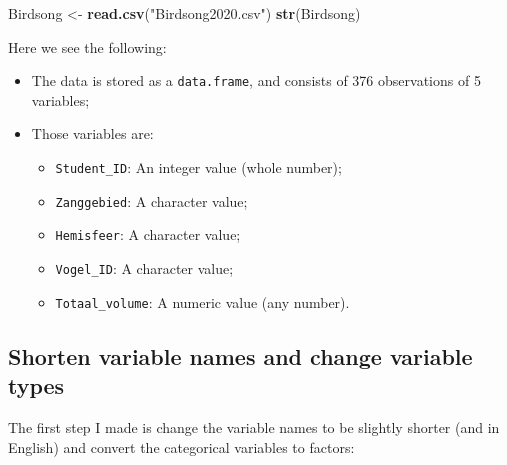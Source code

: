 \documentclass[
]{book}
\newenvironment{Shaded}{\begin{snugshade}}{\end{snugshade}}
\newcommand{\KeywordTok}[1]{\textcolor[rgb]{0.13,0.29,0.53}{\textbf{#1}}}
\newcommand{\NormalTok}[1]{#1}
\newcommand{\OperatorTok}[1]{\textcolor[rgb]{0.81,0.36,0.00}{\textbf{#1}}}
\newcommand{\StringTok}[1]{\textcolor[rgb]{0.31,0.60,0.02}{#1}}
\providecommand{\tightlist}{%
  \setlength{\itemsep}{0pt}\setlength{\parskip}{0pt}}
\begin{document}
\begin{Shaded}
\begin{Highlighting}[]
\NormalTok{Birdsong <-}\StringTok{ }\KeywordTok{read.csv}\NormalTok{(}\StringTok{"Birdsong2020.csv"}\NormalTok{)}
\KeywordTok{str}\NormalTok{(Birdsong)}
\end{Highlighting}
\end{Shaded}

Here we see the following:

\begin{itemize}
\tightlist
\item
  The data is stored as a \texttt{data.frame}, and consists of 376 observations of 5 variables;
\item
  Those variables are:

  \begin{itemize}
  \tightlist
  \item
    \texttt{Student\_ID}: An integer value (whole number);
  \item
    \texttt{Zanggebied}: A character value;
  \item
    \texttt{Hemisfeer}: A character value;
  \item
    \texttt{Vogel\_ID}: A character value;
  \item
    \texttt{Totaal\_volume}: A numeric value (any number).
  \end{itemize}
\end{itemize}

\hypertarget{shorten-variable-names-and-change-variable-types}{%
\subsection{Shorten variable names and change variable types}\label{shorten-variable-names-and-change-variable-types}}

The first step I made is change the variable names to be slightly shorter (and in English) and convert the categorical variables to factors:

\begin{Shaded}
\end{Shaded}
\end{document}

